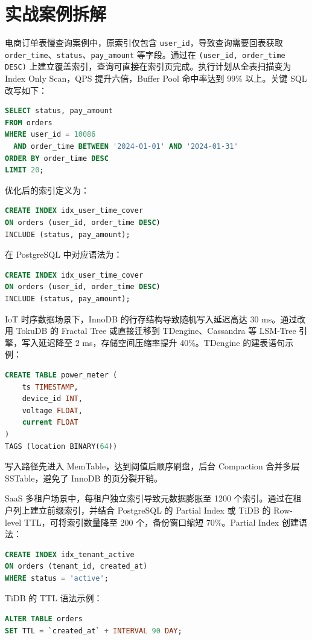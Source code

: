 \chapter{实战案例拆解}
电商订单表慢查询案例中，原索引仅包含 \texttt{user\_{}id}，导致查询需要回表获取 \texttt{order\_{}time}、\texttt{status}、\texttt{pay\_{}amount} 等字段。通过在 \texttt{(user\_{}id, order\_{}time DESC)} 上建立覆盖索引，查询可直接在索引页完成。执行计划从全表扫描变为 Index Only Scan，QPS 提升六倍，Buffer Pool 命中率达到 99\%{} 以上。关键 SQL 改写如下：\par
\begin{lstlisting}[language=sql]
SELECT status, pay_amount
FROM orders
WHERE user_id = 10086
  AND order_time BETWEEN '2024-01-01' AND '2024-01-31'
ORDER BY order_time DESC
LIMIT 20;
\end{lstlisting}
优化后的索引定义为：\par
\begin{lstlisting}[language=sql]
CREATE INDEX idx_user_time_cover
ON orders (user_id, order_time DESC)
INCLUDE (status, pay_amount);
\end{lstlisting}
在 PostgreSQL 中对应语法为：\par
\begin{lstlisting}[language=sql]
CREATE INDEX idx_user_time_cover
ON orders (user_id, order_time DESC)
INCLUDE (status, pay_amount);
\end{lstlisting}
IoT 时序数据场景下，InnoDB 的行存结构导致随机写入延迟高达 30 ms。通过改用 TokuDB 的 Fractal Tree 或直接迁移到 TDengine、Cassandra 等 LSM-Tree 引擎，写入延迟降至 2 ms，存储空间压缩率提升 40\%{}。TDengine 的建表语句示例：\par
\begin{lstlisting}[language=sql]
CREATE TABLE power_meter (
    ts TIMESTAMP,
    device_id INT,
    voltage FLOAT,
    current FLOAT
)
TAGS (location BINARY(64))
\end{lstlisting}
写入路径先进入 MemTable，达到阈值后顺序刷盘，后台 Compaction 合并多层 SSTable，避免了 InnoDB 的页分裂开销。\par
SaaS 多租户场景中，每租户独立索引导致元数据膨胀至 1200 个索引。通过在租户列上建立前缀索引，并结合 PostgreSQL 的 Partial Index 或 TiDB 的 Row-level TTL，可将索引数量降至 200 个，备份窗口缩短 70\%{}。Partial Index 创建语法：\par
\begin{lstlisting}[language=sql]
CREATE INDEX idx_tenant_active
ON orders (tenant_id, created_at)
WHERE status = 'active';
\end{lstlisting}
TiDB 的 TTL 语法示例：\par
\begin{lstlisting}[language=sql]
ALTER TABLE orders
SET TTL = `created_at` + INTERVAL 90 DAY;
\end{lstlisting}
